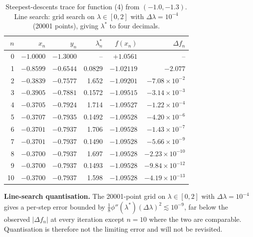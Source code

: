 \documentclass[11pt,a4paper]{article}
\begin{document}
\begin{table}[htbp]
\centering
\caption{Steepest-descents trace for function (4) from \((-1.0,-1.3)\). Line search: grid search on \(\lambda\in[0,2]\) with \(\Delta\lambda=10^{-4}\) (20001 points), giving \(\lambda^{\ast}\) to four decimals.}
\label{tab:q2-trace}
\begin{tabular}{rrrrrr}
\toprule
\(n\) & \(x_n\) & \(y_n\) & \(\lambda_n^\ast\) & \(f(x_n)\) & \(\Delta f_n\)\\
\midrule
0  & \(-1.0000\) & \(-1.3000\) & --      & \(+1.0561\)   & --\\
1  & \(-0.8599\) & \(-0.6544\) & 0.0829  & \(-1.02119\)  & \(-2.077\)\\
2  & \(-0.3839\) & \(-0.7577\) & 1.652   & \(-1.09201\)  & \(-7.08\times 10^{-2}\)\\
3  & \(-0.3905\) & \(-0.7881\) & 0.1572  & \(-1.09515\)  & \(-3.14\times 10^{-3}\)\\
4  & \(-0.3705\) & \(-0.7924\) & 1.714   & \(-1.09527\)  & \(-1.22\times 10^{-4}\)\\
5  & \(-0.3707\) & \(-0.7935\) & 0.1492  & \(-1.09528\)  & \(-4.20\times 10^{-6}\)\\
6  & \(-0.3701\) & \(-0.7937\) & 1.706   & \(-1.09528\)  & \(-1.43\times 10^{-7}\)\\
7  & \(-0.3701\) & \(-0.7937\) & 0.1490  & \(-1.09528\)  & \(-5.66\times 10^{-9}\)\\
8  & \(-0.3700\) & \(-0.7937\) & 1.697   & \(-1.09528\)  & \(-2.23\times 10^{-10}\)\\
9  & \(-0.3700\) & \(-0.7937\) & 0.1493  & \(-1.09528\)  & \(-9.84\times 10^{-12}\)\\
10 & \(-0.3700\) & \(-0.7937\) & 1.598   & \(-1.09528\)  & \(-4.19\times 10^{-13}\)\\
\bottomrule
\end{tabular}
\end{table}

\textbf{Line-search quantisation.}
The 20001-point grid on \(\lambda\in[0,2]\) with \(\Delta\lambda=10^{-4}\) gives a per-step error bounded by \(\tfrac18\phi''(\lambda^{\ast})(\Delta\lambda)^{2}\lesssim 10^{-9}\), far below the observed \(|\Delta f_n|\) at every iteration except \(n=10\) where the two are comparable. Quantisation is therefore not the limiting error and will not be revisited.
\end{document}

